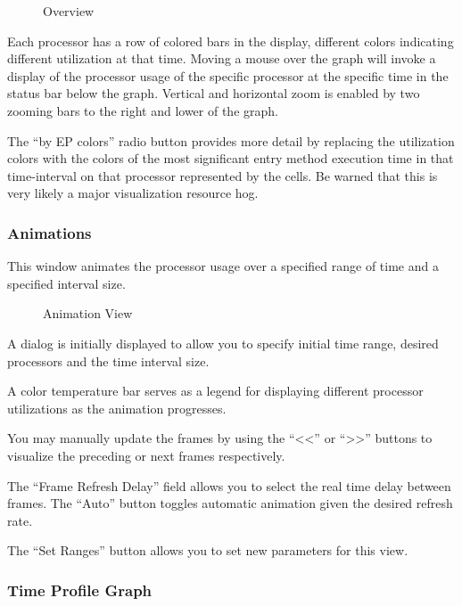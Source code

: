 \documentclass[10pt,dvips]{article}
\begin{document}
\begin{figure}[htb]
\center
{}
\caption{Overview}
\label{overview}
\end{figure}

Each processor has a row of colored bars in the display, different
colors indicating different utilization at that time. Moving a mouse
over the graph will invoke a display of the processor usage of the
specific processor at the specific time in the status bar below the
graph. Vertical and horizontal zoom is enabled by two zooming bars to
the right and lower of the graph.

The ``by EP colors'' radio button provides more detail by replacing
the utilization colors with the colors of the most significant entry
method execution time in that time-interval on that processor
represented by the cells. Be warned that this is very likely a major
visualization resource hog.

\subsubsection{Animations}

This window animates the processor usage over a specified range of
time and a specified interval size. 

\begin{figure}[htb]
\center
{}
\caption{Animation View}
\label{animation}
\end{figure}

A dialog is initially displayed to allow you to specify initial time
range, desired processors and the time interval size.

A color temperature bar serves as a legend for displaying different
processor utilizations as the animation progresses.

You may manually update the frames by using the ``<<'' or ``>>''
buttons to visualize the preceding or next frames respectively.

The ``Frame Refresh Delay'' field allows you to select the real time
delay between frames. The ``Auto'' button toggles automatic animation
given the desired refresh rate.

The ``Set Ranges'' button allows you to set new parameters for this
view.

\subsubsection{Time Profile Graph}
\end{document}
